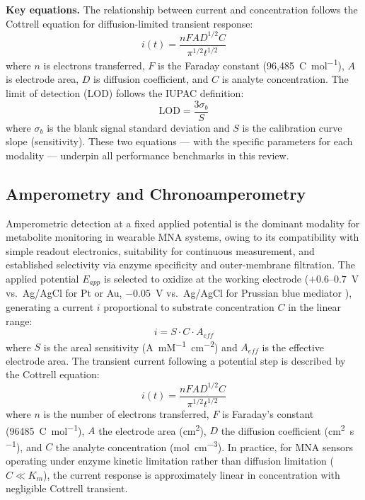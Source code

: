 \documentclass[review,1p]{elsarticle}
\begin{document}
\textbf{Key equations.} The relationship between current and concentration follows the Cottrell equation for diffusion-limited transient response:
\begin{equation}
i(t) = \frac{nFAD^{1/2}C}{\pi^{1/2}t^{1/2}}
\label{eq:cottrell}
\end{equation}
where $n$ is electrons transferred, $F$ is the Faraday constant (96,485~C~mol\textsuperscript{$-1$}), $A$ is electrode area, $D$ is diffusion coefficient, and $C$ is analyte concentration. The limit of detection (LOD) follows the IUPAC definition:
\begin{equation}
\text{LOD} = \frac{3\sigma_b}{S}
\label{eq:lod}
\end{equation}
where $\sigma_b$ is the blank signal standard deviation and $S$ is the calibration curve slope (sensitivity). These two equations — with the specific parameters for each modality — underpin all performance benchmarks in this review.

\subsection{Amperometry and Chronoamperometry}
\label{subsec:amperometry}

Amperometric detection at a fixed applied potential is the dominant modality for metabolite monitoring in wearable MNA systems, owing to its compatibility with simple readout electronics, suitability for continuous measurement, and established selectivity via enzyme specificity and outer-membrane filtration. The applied potential $E_{app}$ is selected to oxidize  at the working electrode ($+0.6$--$0.7$~V vs.~Ag/AgCl for Pt or Au, $-0.05$~V vs.~Ag/AgCl for Prussian blue mediator \cite{Kabata2022}), generating a current $i$ proportional to substrate concentration $C$ in the linear range:
\begin{equation}
i = S \cdot C \cdot A_{eff}
\label{eq:amperometry}
\end{equation}
where $S$ is the areal sensitivity (\textmu{}A~mM\textsuperscript{$-1$}~cm\textsuperscript{$-2$}) and $A_{eff}$ is the effective electrode area. The transient current following a potential step is described by the Cottrell equation:
\begin{equation}
i(t) = \frac{nFAD^{1/2}C}{\pi^{1/2}t^{1/2}}
\label{eq:cottrell}
\end{equation}
where $n$ is the number of electrons transferred, $F$ is Faraday's constant (96485~C~mol\textsuperscript{$-1$}), $A$ the electrode area (cm\textsuperscript{2}), $D$ the diffusion coefficient (cm\textsuperscript{2}~s\textsuperscript{$-1$}), and $C$ the analyte concentration (mol~cm\textsuperscript{$-3$}). In practice, for MNA sensors operating under enzyme kinetic limitation rather than diffusion limitation ($C \ll K_m$), the current response is approximately linear in concentration with negligible Cottrell transient.
\end{document}

